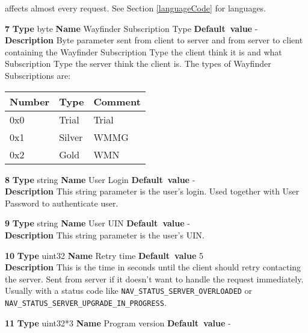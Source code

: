 \begin{list}{\textbf{ParamID}}{}
  affects almost every request. See Section \ref{languageCode} for languages.
\item \textbf{7} \textbf{Type} byte \textbf{Name} Wayfinder Subscription Type
                 \textbf{Default~value} - \\
  \label{Wayfinder Subscription Type}
  \textbf{Description} Byte parameter sent from client to server and from 
  server to client containing the Wayfinder Subscription Type the client 
  think it is and what Subscription Type the server think the client is.
  The types of Wayfinder Subscriptions are:\\
      \begin{tabular}{|l|l|l|}
        \hline
        Number & Type    & Comment \\\hline
        0x0    & Trial   & Trial \\\hline
        0x1    & Silver  & WMMG \\\hline
        0x2    & Gold    & WMN \\\hline
      \end{tabular}
\item \textbf{8} \textbf{Type} string \textbf{Name} User Login
                 \textbf{Default~value} - \\
  \label{User Login}
  \textbf{Description} This string parameter is the user's login. Used 
  together with User Password to authenticate user.
\item \textbf{9} \textbf{Type} string \textbf{Name} User UIN
                 \textbf{Default~value} - \\
  \label{User UIN}
  \textbf{Description} This string parameter is the user's UIN.
\item \textbf{10} \textbf{Type} uint32 \textbf{Name} Retry time
                 \textbf{Default~value} 5 \\
  \label{Retry time}
  \textbf{Description} This is the time in seconds until the client should 
  retry contacting the server. Sent from server if it doesn't want to 
  handle the request immediately. Usually with a status code like 
  {\tt NAV\_STATUS\_SERVER\_OVERLOADED} or 
  {\tt NAV\_STATUS\_SERVER\_UPGRADE\_IN\_PROGRESS}.
\item \textbf{11} \textbf{Type} uint32*3 \textbf{Name} Program version
                 \textbf{Default~value} - \\

\end{list}
